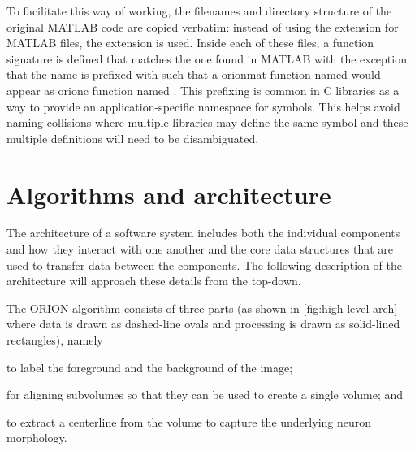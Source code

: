 To facilitate this way of working, the filenames and directory
structure of the original MATLAB code are copied verbatim: instead
of using the  extension for MATLAB files, the
 extension is used. Inside each of these
 files, a function signature is defined that
matches the one found in MATLAB with the exception that the name
is prefixed with  such that a \gls{orionmat}
function named  would appear as
\gls{orionc} function named .
This prefixing is common in C libraries as a way to provide
an application-specific namespace for symbols. This helps avoid
naming collisions where multiple libraries may define the same
symbol and these multiple definitions will need to be disambiguated.

\section{Algorithms and architecture}

The architecture of a software system includes both the individual
components and how they interact with one another and the core
data structures that are used to transfer data between the
components. The following description of the architecture will
approach these details from the top-down.

The ORION algorithm consists of three parts (as shown in
\cref{fig:high-level-arch} where data is drawn as dashed-line
ovals and processing is drawn as solid-lined rectangles),
namely
\begin{description}[font=\textpluscolon]
	\item[Segmentation] to label the
		foreground and the background of the image;
	\item[Registration] for aligning subvolumes so
		that they can be used to create a single volume;
		and
	\item[Tracing] to extract a centerline from the volume to
		capture the underlying neuron morphology.
\end{description}



